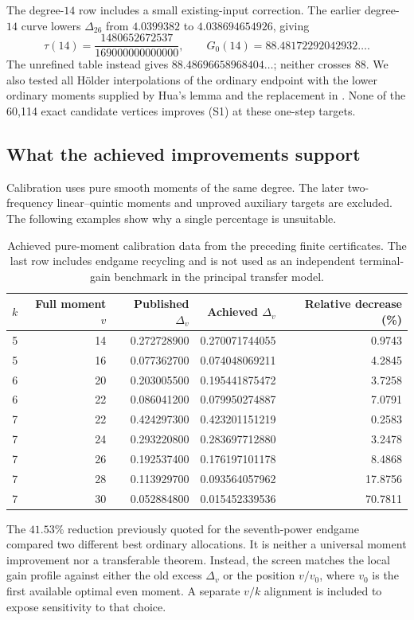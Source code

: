 \documentclass[11pt,letterpaper]{article}
\numberwithin{equation}{section}
\begin{document}
The degree-$14$ row includes a small existing-input correction. The earlier
degree-$14$ curve lowers $\Delta_{26}$ from $4.0399382$ to
$4.038694654926$, giving
\[
 \tau(14)=\frac{1480652672537}{169000000000000},\qquad
 G_0(14)=88.48172292042932\ldots.
\]
The unrefined table instead gives $88.48696658968404\ldots$; neither
crosses $88$. We also tested all H\"older interpolations of the ordinary
endpoint with the lower ordinary moments supplied by Hua's lemma and the
replacement in \cite[Theorem~10]{Bou16}. None of the 60,114 exact candidate
vertices improves (S1) at these one-step targets.

\subsection{What the achieved improvements support}

Calibration uses pure smooth moments of the same degree. The later
two-frequency linear--quintic moments and unproved auxiliary targets are
excluded. The following examples show why a single percentage is unsuitable.

\begin{table}[htbp]
\centering\small
\begin{tabular}{rrrrr}
\hline
$k$ & Full moment $v$ & Published $\Delta_v$ & Achieved $\Delta_v$
 & Relative decrease (\%)\\
\hline
5&14&0.272728900&0.270071744055&0.9743\\
5&16&0.077362700&0.074048069211&4.2845\\
6&20&0.203005500&0.195441875472&3.7258\\
6&22&0.086041200&0.079950274887&7.0791\\
7&22&0.424297300&0.423201151219&0.2583\\
7&24&0.293220800&0.283697712880&3.2478\\
7&26&0.192537400&0.176197101178&8.4868\\
7&28&0.113929700&0.093564057962&17.8756\\
7&30&0.052884800&0.015452339536&70.7811\\
\hline
\end{tabular}
\caption{Achieved pure-moment calibration data from the preceding finite
certificates. The last row includes endgame recycling and is not used as an
independent terminal-gain benchmark in the principal transfer model.}
\label{tab:achieved-calibration}
\end{table}

The $41.53\%$ reduction previously quoted for the seventh-power endgame
compared two different best ordinary allocations. It is neither a universal
moment improvement nor a transferable theorem. Instead, the screen matches
the local gain profile against either the old excess $\Delta_v$ or the
position $v/v_0$, where $v_0$ is the first available optimal even moment.
A separate $v/k$ alignment is included to expose sensitivity to that choice.
\end{document}
